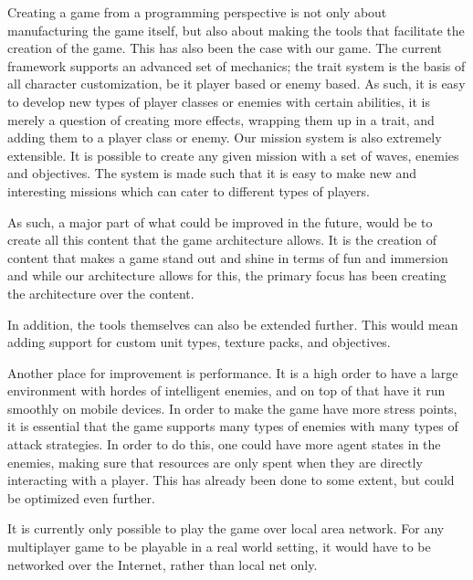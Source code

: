 Creating a game from a programming perspective is not only about manufacturing the game itself, but also about making the tools that facilitate the creation of the game.
This has also been the case with our game.
The current framework supports an advanced set of mechanics; the trait system is the basis of all character customization, be it player based or enemy based.
As such, it is easy to develop new types of player classes or enemies with certain abilities, it is merely a question of creating more effects, wrapping them up in a trait, and adding them to a player class or enemy.
Our mission system is  also extremely extensible.
It is possible to create any given mission with a set of waves, enemies and objectives.
The system is made such that it is easy to make new and interesting missions which can cater to different types of players. 

As such, a major part of what could be improved in the future, would be to create all this content that the game architecture allows.
It is the creation of content that makes a game stand out and shine in terms of fun and immersion and while our architecture allows for this, the primary focus has been creating the architecture over the content. 

In addition, the tools themselves can also be extended further.
This would mean adding support for custom unit types, texture packs, and objectives.

Another place for improvement is performance.
It is a high order to have a large environment with hordes of intelligent enemies, and on top of that have it run smoothly on mobile devices.
In order to make the game have more stress points, it is essential that the game supports many types of enemies with many types of attack strategies.
In order to do this, one could have more agent states in the enemies, making sure that resources are only spent when they are directly interacting with a player.
This has already been done to some extent, but could be optimized even further.

It is currently only possible to play the game over local area network.
For any multiplayer game to be playable in a real world setting, it would have to be networked over the Internet, rather than local net only.